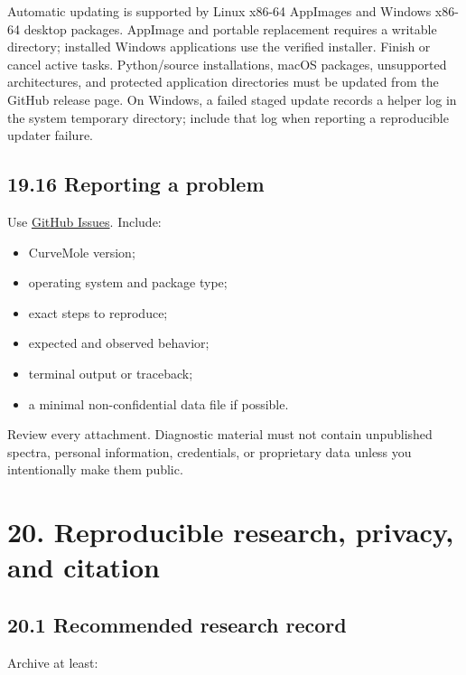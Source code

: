\documentclass[
  10pt,
  a4paper,
  oneside]{scrreprt}
\providecommand{\tightlist}{%
  \setlength{\itemsep}{0pt}\setlength{\parskip}{0pt}}
\begin{document}
Automatic updating is supported by Linux x86-64 AppImages and Windows
x86-64 desktop packages. AppImage and portable replacement requires a
writable directory; installed Windows applications use the verified
installer. Finish or cancel active tasks. Python/source installations,
macOS packages, unsupported architectures, and protected application
directories must be updated from the GitHub release page. On Windows, a
failed staged update records a helper log in the system temporary
directory; include that log when reporting a reproducible updater
failure.

\hypertarget{reporting-a-problem}{%
\section{19.16 Reporting a problem}\label{reporting-a-problem}}

Use \href{https://github.com/SebRoLENS/curvemole/issues}{GitHub Issues}.
Include:

\begin{itemize}
\tightlist
\item
  CurveMole version;
\item
  operating system and package type;
\item
  exact steps to reproduce;
\item
  expected and observed behavior;
\item
  terminal output or traceback;
\item
  a minimal non-confidential data file if possible.
\end{itemize}

Review every attachment. Diagnostic material must not contain
unpublished spectra, personal information, credentials, or proprietary
data unless you intentionally make them public.

\hypertarget{reproducible-research-privacy-and-citation}{%
\chapter{20. Reproducible research, privacy, and
citation}\label{reproducible-research-privacy-and-citation}}

\hypertarget{recommended-research-record}{%
\section{20.1 Recommended research
record}\label{recommended-research-record}}

Archive at least:
\end{document}
